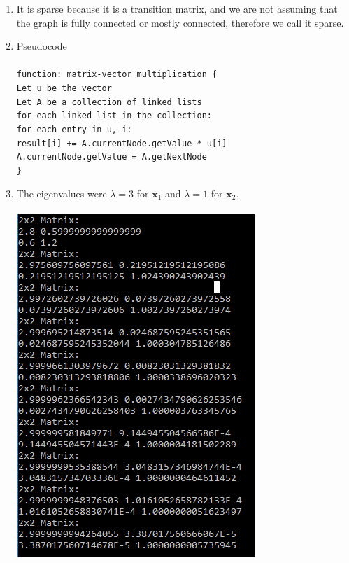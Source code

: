 \documentclass{article}
\newcommand\tab[1][1cm]{\hspace*{#1}}
\begin{document}
\begin{enumerate}
\item It is sparse because it is a transition matrix, and we are not assuming that the graph is fully connected or mostly connected, therefore we call it sparse. 

\item Pseudocode\\\\
	{\tt function: matrix-vector multiplication \{ \\
	\tab	Let u be the vector\\
	\tab	Let A be a collection of linked lists\\
	\tab	for each linked list in the collection: \\
	\tab\tab		for each entry in u, i:\\
	\tab\tab\tab		 result[i] += A.currentNode.getValue * u[i]\\
	\tab\tab\tab		 A.currentNode.getValue = A.getNextNode
			 \\
		\} }

\item The eigenvalues were $\lambda = 3$ for $\textbf{x}_1$ and $\lambda = 1$ for $\textbf{x}_2$.
	\\\\
	\includegraphics[scale=1]{exercise26}


\end{enumerate}
\end{document}
